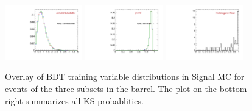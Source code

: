 \begin{figure}
  \includegraphics[width=0.3\textwidth]{Figures/VariablesComparison/MC_barrel_figs_3h/delta3dErr}
  \includegraphics[width=0.3\textwidth]{Figures/VariablesComparison/MC_barrel_figs_3h/pvw8}
  \includegraphics[width=0.3\textwidth]{Figures/VariablesComparison/MC_barrel_figs_3h/KS}
  \caption{Overlay of BDT training variable distributions in Signal MC for events of the three subsets in the barrel. The plot on the bottom right summarizes all KS probablities.}
  \label{fig:MC_barrel_figs_3h}
\end{figure}


